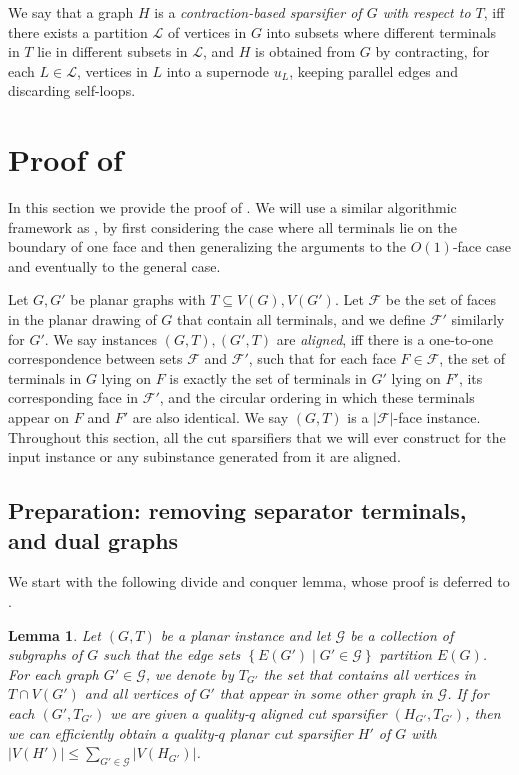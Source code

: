 \documentclass[11pt]{article}
\newtheorem{lemma}[theorem]{Lemma}
\theoremstyle{definition}
\newcommand{\set}[1]{\left\{ #1 \right\}}
\newcommand{\lset}{{\mathcal{L}}}
\newcommand{\fset}{{\mathcal{F}}}
\newcommand{\gset}{{\mathcal{G}}}
\newcounter{note}
\begin{document}
We say that a graph $H$ is a \emph{contraction-based sparsifier of $G$ with respect to $T$}, iff there exists a partition $\lset$ of vertices in $G$ into subsets where different terminals in $T$ lie in different subsets in $\lset$, and $H$ is obtained from $G$ by contracting, for each $L\in\lset$, vertices in $L$ into a supernode $u_L$, keeping parallel edges and discarding self-loops. 

 
\section{Proof of }
\label{sec: planar}

\newcommand{\gluepath}{{\mathsf{Glue}}}
\newcommand{\cutpath}{{\mathsf{Cut}}}

In this section we provide the proof of . We will use a similar algorithmic framework as \cite{chang2022near}, by first considering the case where all terminals lie on the boundary of one face and then generalizing the arguments to the $O(1)$-face case and eventually to the general case.

Let $G,G'$ be planar graphs with $T\subseteq V(G),V(G')$.
Let $\fset$ be the set of faces in the planar drawing of $G$ that contain all terminals, and we define $\fset'$ similarly for $G'$.
We say instances $(G,T),(G',T)$ are \emph{aligned}, iff there is a one-to-one correspondence between sets $\fset$ and $\fset'$, such that for each face $F\in \fset$, the set of terminals in $G$ lying on $F$ is exactly the set of terminals in $G'$ lying on $F'$, its corresponding face in $\fset'$, and the circular ordering in which these terminals appear on $F$ and $F'$ are also identical.
We say $(G,T)$ is a $|\fset|$-face instance. Throughout this section, all the cut sparsifiers that we will ever construct for the input instance or any subinstance generated from it are aligned.

\subsection{Preparation: removing separator terminals, and dual graphs}

We start with the following divide and conquer lemma, whose proof is deferred to .

\begin{lemma}
\label{lem: divide}
Let $(G,T)$ be a planar instance and let $\gset$ be a collection of subgraphs of $G$ such that the edge sets $\set{E(G') \mid G'\in \gset}$ partition $E(G)$. For each graph $G'\in \gset$, we denote by $T_{G'}$ the set that contains all vertices in $T\cap V(G')$ and all vertices of $G'$ that appear in some other graph in $\gset$.
If for each $(G',T_{G'})$ we are given a quality-$q$ aligned cut sparsifier $(H_{G'}, T_{G'})$, then we can efficiently obtain a quality-$q$ planar cut sparsifier $H'$ of $G$ with $|V(H')|\le \sum_{G'\in \gset}|V(H_{G'})|$.
\end{lemma}
\end{document}
